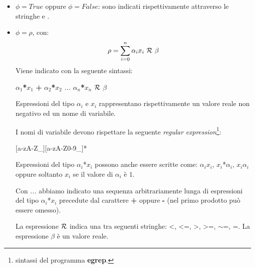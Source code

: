 \documentclass[10pt,a4paper]{article}
\begin{document}
	\begin{itemize}
		\item $\phi=True$ oppure $\phi=False$: sono indicati rispettivamente attraverso le stringhe \TRUE{} e \FALSE{}.
		\item $\phi = \rho$, con:
			\begin{equation*}
				\rho = \sum_{i=0}^{n}{\alpha{}_i x_i\ \MetaRel\ \beta{}}
			\end{equation*}
			Viene indicato con la seguente sintassi:
			\begin{center}
				\newcommand{\Prod}{\textbf{*}}
				\newcommand{\Sum}{\textbf{+}}
				$\alpha_1$\Prod$x_1$ \Sum{} $\alpha_2$\Prod$x_2$ \emph{...} $\alpha_n$\Prod$x_n$ $\mathcal{R}$ $\beta$
			\end{center}
			
			Espressioni del tipo $\alpha_i$ e $x_i$ rappresentano rispettivamente un valore reale non negativo ed un nome di variabile.
			
			I nomi di variabile devono rispettare la seguente \emph{regular expression}\footnote{sintassi del programma \textbf{egrep}.}:
			\begin{center}
				[a-zA-Z\_][a-zA-Z0-9\_]*
			\end{center}
			
			Espressioni del tipo  $\alpha_i$*$x_i$ possono anche essere scritte come:  $\alpha_i$$x_i$, $x_i$*$\alpha_i$, $x_i$$\alpha_i$ oppure soltanto $x_i$ se il valore di $\alpha_i$ è $1$.
			
			Con \emph{...} abbiamo indicato una sequenza arbitrariamente lunga di espressioni del tipo $\alpha_i$*$x_i$ precedute dal carattere \textbf{+} oppure \textbf{-} (nel primo prodotto può essere omesso).
			
			La espressione $\mathcal{R}$ indica una tra seguenti stringhe: <, <=, >, >=, $\sim$=, =. La espressione $\beta$ è un valore reale.
			 
			 \newpage
			 \hrulefill
			 
\end{itemize}
\end{document}
